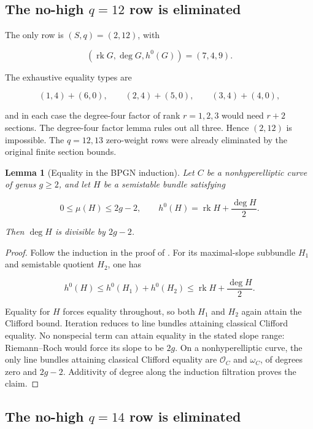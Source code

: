 \documentclass[11pt]{article}
\newtheorem{lemma}[theorem]{Lemma}
\theoremstyle{definition}
\begin{document}
\subsection{\texorpdfstring{The no-high \(q=12\) row is
eliminated}{The no-high q=12 row is eliminated}}\label{the-no-high-q12-row-is-eliminated}

The only row is \((S,q)=(2,12)\), with

\[(\operatorname{rk}G,\deg G,h^0(G))=(7,4,9).\]

The exhaustive equality types are

\[(1,4)+(6,0),\qquad (2,4)+(5,0),\qquad (3,4)+(4,0),\]

and in each case the degree-four factor of rank \(r=1,2,3\) would need
\(r+2\) sections. The degree-four factor lemma rules out all three.
Hence \((2,12)\) is impossible. The \(q=12,13\) zero-weight rows were
already eliminated by the original finite section bounds.

\begin{lemma}[Equality in the BPGN induction]
\label{lem:bpgn-equality-degree}
Let \(C\) be a nonhyperelliptic curve of genus \(g\ge2\), and let \(H\) be
a semistable bundle satisfying

\[0\le\mu(H)\le2g-2,
\qquad h^0(H)=\operatorname{rk}H+\frac{\deg H}{2}.\]

Then \(\deg H\) is divisible by \(2g-2\).
\end{lemma}

\begin{proof}
Follow the induction in the proof of \cite[Theorem~2.1]{BPGN}.  For its
maximal-slope subbundle \(H_1\) and semistable quotient \(H_2\), one has

\[h^0(H)\le h^0(H_1)+h^0(H_2)
\le \operatorname{rk}H+\frac{\deg H}{2}.\]

Equality for \(H\) forces equality throughout, so both \(H_1\) and \(H_2\)
again attain the Clifford bound.  Iteration reduces to line bundles
attaining classical Clifford equality.  No nonspecial term can attain
equality in the stated slope range: Riemann--Roch would force its slope to
be \(2g\).  On a nonhyperelliptic curve, the only line bundles attaining
classical Clifford equality are \(\mathcal O_C\) and \(\omega_C\), of
degrees zero and \(2g-2\).  Additivity of degree along the induction
filtration proves the claim.
\end{proof}

\subsection{\texorpdfstring{The no-high \(q=14\) row is
eliminated}{The no-high q=14 row is eliminated}}\label{the-no-high-q14-row-is-eliminated}
\end{document}
